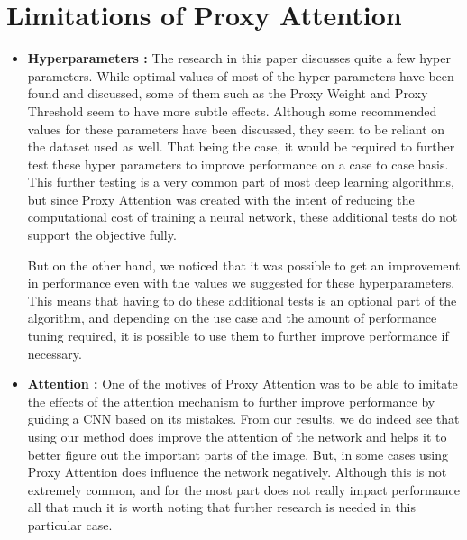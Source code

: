 \section{Limitations of Proxy Attention}
\begin{itemize}
\item \textbf{Hyperparameters :} The research in this paper discusses quite a few hyper parameters. While optimal values of most of the hyper parameters have been found and discussed, some of them such as the Proxy Weight and Proxy Threshold seem to have more subtle effects. Although some recommended values for these parameters have been discussed, they seem to be reliant on the dataset used as well. That being the case, it would be required to further test these hyper parameters to improve performance on a case to case basis. This further testing is a very common part of most deep learning algorithms, but since Proxy Attention was created with the intent of reducing the computational cost of training a neural network, these additional tests do not support the objective fully. 

But on the other hand, we noticed that it was possible to get an improvement in performance even with the values we suggested for these hyperparameters. This means that having to do these additional tests is an optional part of the algorithm, and depending on the use case and the amount of performance tuning required, it is possible to use them to further improve performance if necessary.
\item \textbf{Attention :} One of the motives of Proxy Attention was to be able to imitate the effects of the attention mechanism to further improve performance by guiding a CNN based on its mistakes. From our results, we do indeed see that using our method does improve the attention of the network and helps it to better figure out the important parts of the image. But, in some cases using Proxy Attention does influence the network negatively. Although this is not extremely common, and for the most part does not really impact performance all that much it is worth noting that further research is needed in this particular case. 


\end{itemize}
